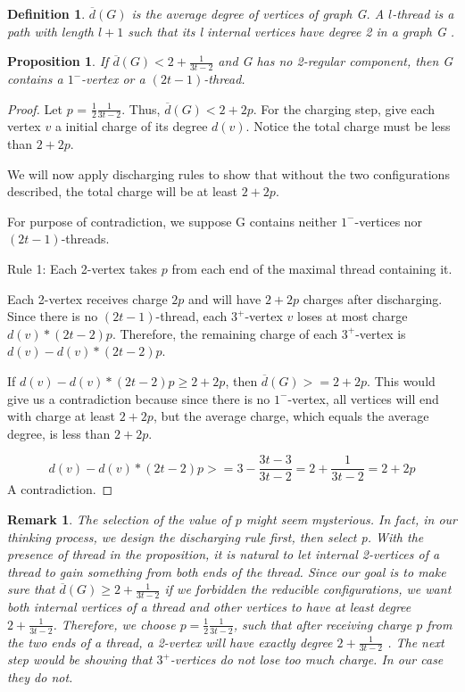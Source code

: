 \documentclass[a4paper, 11pt]{article} %
\newtheorem*{definition}{Definition}
\newtheorem*{remark}{Remark}
\newtheorem{proposition}{Proposition}[section]
\begin{document}
\begin{definition}
$\overline{d}(G)$ is the average degree of vertices of graph G. A $l$-thread is a path with length $l + 1$ such that its l internal vertices have degree 2 in a graph G \cite{cranston2013guide}.
\end{definition}

\begin{proposition}
\cite{cranston2013guide} If $\overline{d}(G)< 2+\frac{1}{3t-2} $ and G has no 2-regular component, then G contains a $1^{-}$-vertex or a $(2t-1)$-thread.
\end{proposition}
 
\begin{proof}
\cite{cranston2013guide} Let $p$ = $\frac{1}{2}\frac{1}{3t-2}$. Thus, $\overline{d}(G)< 2 + 2p$. For the charging step, give each vertex $v$ a initial charge of its degree $d(v)$. Notice the total charge must be less than $2 + 2p$. 

We will now apply discharging rules to show that without the two configurations described, the total charge will be at least $2 + 2p$.

For purpose of contradiction, we suppose G contains neither $1^{-}$-vertices nor $(2t-1)$-threads.

Rule 1: Each 2-vertex takes $p$ from each end of the maximal thread containing it.

Each 2-vertex receives charge $2p$ and will have $2 + 2p$ charges after discharging. Since there is no $(2t-1)$-thread, each $3^{+}$-vertex $v$ loses at most charge $d(v)*(2t-2)p$. Therefore, the remaining charge of each $3^{+}$-vertex is $d(v) - d(v)*(2t-2)p$.

If $d(v) - d(v)*(2t-2)p \geq 2 + 2p$, then $\overline{d}(G) >= 2+2p$. This would give us a contradiction because since there is no $1^{-}$-vertex, all vertices will end with charge at least $2 + 2p$, but the average charge, which equals the average degree, is less than $2 + 2p$.

\[d(v) - d(v)*(2t-2)p >= 3 - \frac{3t-3}{3t-2} = 2 + \frac{1}{3t-2} = 2 + 2p\]
A contradiction.
\end{proof}
 
\begin{remark}
The selection of the value of $p$ might seem mysterious. In fact, in our thinking process, we design the discharging rule first, then select p. With the presence of thread in the proposition, it is natural to let internal 2-vertices of a thread to gain something from both ends of the thread. Since our goal is to make sure that $\overline{d}(G) \geq 2+\frac{1}{3t-2}$ if we forbidden the reducible configurations, we want both internal vertices of a thread and other vertices to have at least degree $2+\frac{1}{3t-2}$. Therefore, we choose $p = \frac{1}{2}\frac{1}{3t-2}$, such that after receiving charge $p$ from the two ends of a thread, a 2-vertex will have exactly degree $2+\frac{1}{3t-2}$ \cite{cranston2013guide}. The next step would be showing that $3^{+}$-vertices do not lose too much charge. In our case they do not. 
\end{remark}
 
\end{document}
